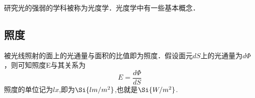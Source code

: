 
\begin{issues}
\issueDraft
\end{issues}

研究光的强弱的学科被称为光度学．光度学中有一些基本概念．
\subsection{照度}
被光线照射的面上的光通量与面积的比值即为照度．假设面元$dS$上的光通量为$d\Phi$，则可知照度{E}与其关系为
\begin{equation}
E = \frac{d\Phi}{dS}
\end{equation}
照度的单位记为$lx$,即为$\Si{lm/m^2}$,也就是$\Si{W/m^2}$.

